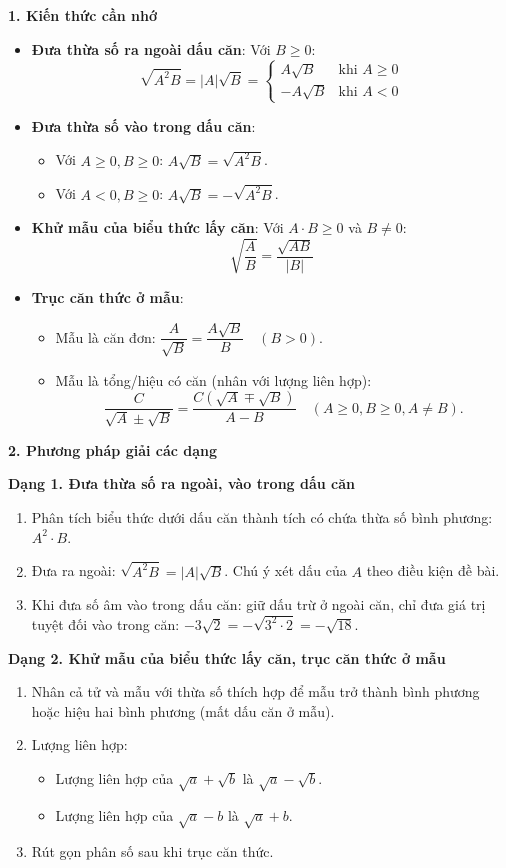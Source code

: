 \textbf{1. Kiến thức cần nhớ}
\begin{itemize}
\item \textbf{Đưa thừa số ra ngoài dấu căn}: Với $B \ge 0$:
$$\boxed{\sqrt{A^2 B} = |A|\sqrt{B} = \begin{cases} A\sqrt{B} & \text{khi } A \ge 0 \\ -A\sqrt{B} & \text{khi } A < 0 \end{cases}}$$
\item \textbf{Đưa thừa số vào trong dấu căn}:
\begin{itemize}
\item Với $A \ge 0, B \ge 0$: $\boxed{A\sqrt{B} = \sqrt{A^2 B}}$.
\item Với $A < 0, B \ge 0$: $\boxed{A\sqrt{B} = -\sqrt{A^2 B}}$.
\end{itemize}
\item \textbf{Khử mẫu của biểu thức lấy căn}: Với $A \cdot B \ge 0$ và $B \ne 0$:
$$\boxed{\sqrt{\dfrac{A}{B}} = \dfrac{\sqrt{AB}}{|B|}}$$
\item \textbf{Trục căn thức ở mẫu}:
\begin{itemize}
\item Mẫu là căn đơn: $\boxed{\dfrac{A}{\sqrt{B}} = \dfrac{A\sqrt{B}}{B}}\quad (B > 0)$.
\item Mẫu là tổng/hiệu có căn (nhân với lượng liên hợp):
$$\boxed{\dfrac{C}{\sqrt{A} \pm \sqrt{B}} = \dfrac{C(\sqrt{A} \mp \sqrt{B})}{A - B}}\quad (A \ge 0, B \ge 0, A \ne B).$$
\end{itemize}
\end{itemize}

\textbf{2. Phương pháp giải các dạng}

\textbf{Dạng 1. Đưa thừa số ra ngoài, vào trong dấu căn}
\begin{enumerate}
\item Phân tích biểu thức dưới dấu căn thành tích có chứa thừa số bình phương: $A^2 \cdot B$.
\item Đưa ra ngoài: $\sqrt{A^2 B} = |A|\sqrt{B}$. Chú ý xét dấu của $A$ theo điều kiện đề bài.
\item Khi đưa số âm vào trong dấu căn: giữ dấu trừ ở ngoài căn, chỉ đưa giá trị tuyệt đối vào trong căn: $-3\sqrt{2} = -\sqrt{3^2 \cdot 2} = -\sqrt{18}$.
\end{enumerate}

\textbf{Dạng 2. Khử mẫu của biểu thức lấy căn, trục căn thức ở mẫu}
\begin{enumerate}
\item Nhân cả tử và mẫu với thừa số thích hợp để mẫu trở thành bình phương hoặc hiệu hai bình phương (mất dấu căn ở mẫu).
\item Lượng liên hợp:
\begin{itemize}
\item Lượng liên hợp của $\sqrt{a} + \sqrt{b}$ là $\sqrt{a} - \sqrt{b}$.
\item Lượng liên hợp của $\sqrt{a} - b$ là $\sqrt{a} + b$.
\end{itemize}
\item Rút gọn phân số sau khi trục căn thức.
\end{enumerate}

